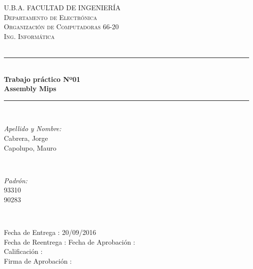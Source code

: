 \documentclass{article}
\begin{document}
\begin{titlepage}
\newcommand{\HRule}{\rule{\linewidth}{0.5mm}} %

\center %
 

\textsc{\LARGE U.B.A.    FACULTAD DE INGENIER\'IA}\\[1cm] %
\textsc{\Large Departamento de Electr\'onica \\ Organizaci\'on de Computadoras 66-20\\
Ing. Inform\'atica} \\%
\textsc{\large }\\%


\HRule \\[0.4cm]
{ \huge \bfseries Trabajo pr\'actico Nº01\\ Assembly Mips}\\[0.4cm] %
\HRule \\[1.5cm]
 
\begin{minipage}{0.4\textwidth}
\begin{flushleft} \large
\emph{Apellido y Nombre:}\\
Cabrera, Jorge\\
Capolupo, Mauro\\
\end{flushleft}
\end{minipage}
~
\begin{minipage}{0.4\textwidth}
\begin{flushright} \large
\emph{Padrón:} \\
93310\\
90283\\
\end{flushright}
\end{minipage}\\[2cm]

\begin{flushleft} \large
{ Fecha de Entrega : 20/09/2016 \\
  Fecha de Reentrega :
  Fecha de Aprobaci\'on :\\
  Calificaci\'on :\\
  Firma de Aprobaci\'on :
}
\end{flushleft}

\vfill %

\end{titlepage}
\end{document}
